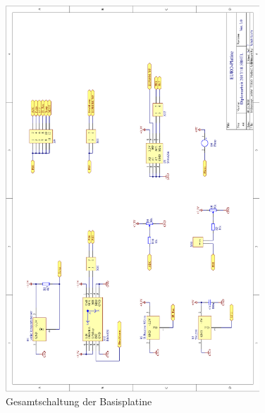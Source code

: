 \begin{figure}[H]\ContinuedFloat
    \centering
    \includegraphics[width=0.85\textwidth]{Schuh/Pictures/Basis-Schaltung2}
    \caption[Gesamtschaltung der Basisplatine]{Gesamtschaltung der \gls{Basisplatine}}
\end{figure}
